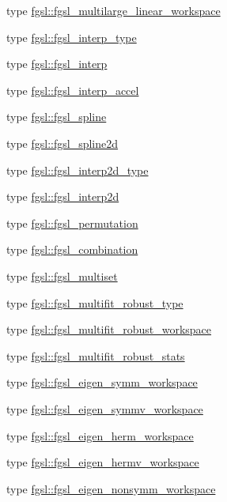 \begin{DoxyCompactItemize}
\item 
type \hyperlink{structfgsl_1_1fgsl__multilarge__linear__workspace}{fgsl\+::fgsl\+\_\+multilarge\+\_\+linear\+\_\+workspace}
\item 
type \hyperlink{structfgsl_1_1fgsl__interp__type}{fgsl\+::fgsl\+\_\+interp\+\_\+type}
\item 
type \hyperlink{structfgsl_1_1fgsl__interp}{fgsl\+::fgsl\+\_\+interp}
\item 
type \hyperlink{structfgsl_1_1fgsl__interp__accel}{fgsl\+::fgsl\+\_\+interp\+\_\+accel}
\item 
type \hyperlink{structfgsl_1_1fgsl__spline}{fgsl\+::fgsl\+\_\+spline}
\item 
type \hyperlink{structfgsl_1_1fgsl__spline2d}{fgsl\+::fgsl\+\_\+spline2d}
\item 
type \hyperlink{structfgsl_1_1fgsl__interp2d__type}{fgsl\+::fgsl\+\_\+interp2d\+\_\+type}
\item 
type \hyperlink{structfgsl_1_1fgsl__interp2d}{fgsl\+::fgsl\+\_\+interp2d}
\item 
type \hyperlink{structfgsl_1_1fgsl__permutation}{fgsl\+::fgsl\+\_\+permutation}
\item 
type \hyperlink{structfgsl_1_1fgsl__combination}{fgsl\+::fgsl\+\_\+combination}
\item 
type \hyperlink{structfgsl_1_1fgsl__multiset}{fgsl\+::fgsl\+\_\+multiset}
\item 
type \hyperlink{structfgsl_1_1fgsl__multifit__robust__type}{fgsl\+::fgsl\+\_\+multifit\+\_\+robust\+\_\+type}
\item 
type \hyperlink{structfgsl_1_1fgsl__multifit__robust__workspace}{fgsl\+::fgsl\+\_\+multifit\+\_\+robust\+\_\+workspace}
\item 
type \hyperlink{structfgsl_1_1fgsl__multifit__robust__stats}{fgsl\+::fgsl\+\_\+multifit\+\_\+robust\+\_\+stats}
\item 
type \hyperlink{structfgsl_1_1fgsl__eigen__symm__workspace}{fgsl\+::fgsl\+\_\+eigen\+\_\+symm\+\_\+workspace}
\item 
type \hyperlink{structfgsl_1_1fgsl__eigen__symmv__workspace}{fgsl\+::fgsl\+\_\+eigen\+\_\+symmv\+\_\+workspace}
\item 
type \hyperlink{structfgsl_1_1fgsl__eigen__herm__workspace}{fgsl\+::fgsl\+\_\+eigen\+\_\+herm\+\_\+workspace}
\item 
type \hyperlink{structfgsl_1_1fgsl__eigen__hermv__workspace}{fgsl\+::fgsl\+\_\+eigen\+\_\+hermv\+\_\+workspace}
\item 
type \hyperlink{structfgsl_1_1fgsl__eigen__nonsymm__workspace}{fgsl\+::fgsl\+\_\+eigen\+\_\+nonsymm\+\_\+workspace}

\end{DoxyCompactItemize}
